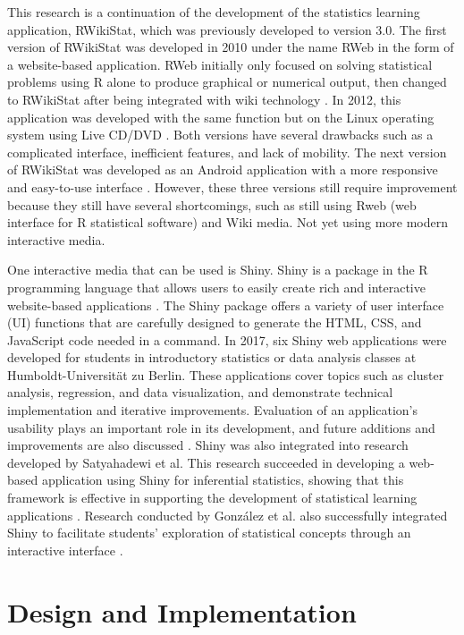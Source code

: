 \documentclass[conference,a4paper]{IEEEtran}
\begin{document}
This research is a continuation of the development of the statistics learning
application, RWikiStat, which was previously developed to version 3.0. The
first version of RWikiStat was developed in 2010 under the name RWeb in the
form of a website-based application. RWeb initially only focused on solving
statistical problems using R alone to produce graphical or numerical output,
then changed to RWikiStat after being integrated with wiki technology
\cite{b3}. In 2012, this application was developed with the same function but
on the Linux operating system using Live CD/DVD \cite{b4}. Both versions have
several drawbacks such as a complicated interface, inefficient features, and
lack of mobility. The next version of RWikiStat was developed as an Android
application with a more responsive and easy-to-use interface \cite{b5}.
However, these three versions still require improvement because they still have
several shortcomings, such as still using Rweb (web interface for R statistical
software) and Wiki media. Not yet using more modern interactive media.

One interactive media that can be used is Shiny. Shiny is a package in the R
programming language that allows users to easily create rich and interactive
website-based applications \cite{b6}. The Shiny package offers a variety of
user interface (UI) functions that are carefully designed to generate the HTML,
CSS, and JavaScript code needed in a command. In 2017, six Shiny web
applications were developed for students in introductory statistics or data
analysis classes at Humboldt-Universität zu Berlin. These applications cover
topics such as cluster analysis, regression, and data visualization, and
demonstrate technical implementation and iterative improvements. Evaluation of
an application's usability plays an important role in its development, and
future additions and improvements are also discussed \cite{b7}. Shiny was also
integrated into research developed by Satyahadewi et al. This research
succeeded in developing a web-based application using Shiny for inferential
statistics, showing that this framework is effective in supporting the
development of statistical learning applications \cite{b9}. Research conducted
by González et al. also successfully integrated Shiny to facilitate students'
exploration of statistical concepts through an interactive interface \cite{b9}.

\section{Design and Implementation}
\label{sect:d_and_i}
\end{document}
